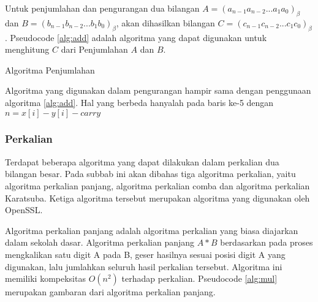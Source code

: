       Untuk penjumlahan dan pengurangan dua bilangan $A = (a_{n-1} a_{n-2} ... a_{1} a_{0})_\beta$ dan $B = (b_{n-1} b_{n-2} ... b_{1} b_{0})_\beta$, akan dihasilkan bilangan $C = (c_{n-1} c_{n-2} ... c_{1} c_{0})_\beta$. Pseudocode \ref{alg:add} adalah algoritma yang dapat digunakan untuk menghitung $C$ dari Penjumlahan $A$ dan $B$.

      \begin{algorithm}
        \caption{Algoritma Penjumlahan}
        \label{alg:add}
        \begin{algorithmic}[1]
          \Statex
          \EndFor
          \State {}
          \EndFunction
        \end{algorithmic}
      \end{algorithm}

      Algoritma yang digunakan dalam pengurangan hampir sama dengan penggunaan algoritma \ref{alg:add}. Hal yang berbeda hanyalah pada baris ke-5 dengan $n = x[i] - y[i] - carry $

    \subsubsection{Perkalian} \label{sec:mul_theory}

      Terdapat beberapa algoritma yang dapat dilakukan dalam perkalian dua bilangan besar. Pada subbab ini akan dibahas tiga algoritma perkalian, yaitu algoritma perkalian panjang, algoritma perkalian comba dan algoritma perkalian Karatsuba. Ketiga algoritma tersebut merupakan algoritma yang digunakan oleh OpenSSL.

      Algoritma perkalian panjang adalah algoritma perkalian yang biasa diajarkan dalam sekolah dasar. Algoritma perkalian panjang $A*B$ berdasarkan pada proses mengkalikan satu digit A pada B, geser hasilnya sesuai posisi digit A yang digunakan, lalu jumlahkan seluruh hasil perkalian tersebut. Algoritma ini memiliki kompeksitas $O(n^2)$ terhadap perkalian. Pseudocode \ref{alg:mul} merupakan gambaran dari algoritma perkalian panjang.

